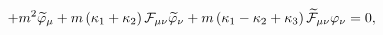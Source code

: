 \begin{equation}
+ m^2 \widetilde{\varphi}_\mu +m\left(\kappa_1 +\kappa_2
\right){\cal F}_{\mu\nu}\widetilde{\varphi}_{\nu}+m\left(\kappa_1
-\kappa_2 +\kappa_3 \right)\widetilde{{\cal
F}}_{\mu\nu}\varphi_{\nu}=0 , \label{95}
\end{equation}

